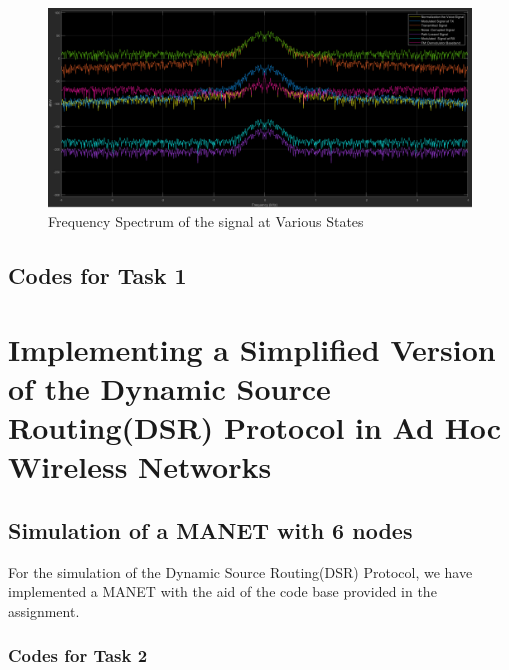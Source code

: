 \documentclass[a4paper,11pt]{article}%
\begin{document}
\begin{figure}[!h]
	\centering
	\includegraphics[scale = 0.42]{figures/spect2}
	\caption{Frequency Spectrum of the signal at Various States}
\end{figure}



\pagebreak

\subsection{Codes for Task 1}



\pagebreak


\vfill


\pagebreak

\section{Implementing a Simplified Version of the Dynamic Source Routing(DSR) Protocol in Ad Hoc Wireless Networks}

\subsection{Simulation of a MANET with 6 nodes}
For the simulation of the Dynamic Source Routing(DSR) Protocol, we have implemented a MANET with the aid of the code base provided in the assignment.

\subsubsection{Codes for Task 2}
\end{document}

